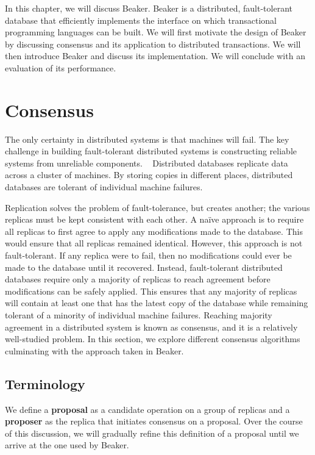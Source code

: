 \documentclass[../main.tex]{subfiles}
\begin{document}
In this chapter, we will discuss Beaker. Beaker is a distributed, fault-tolerant database that
efficiently implements the interface on which transactional programming languages can be built. We
will first motivate the design of Beaker by discussing consensus and its application to distributed
transactions. We will then introduce Beaker and discuss its implementation. We will conclude with an
evaluation of its performance.

\section{Consensus}
The only certainty in distributed systems is that machines will fail. The key challenge in building
fault-tolerant distributed systems is constructing reliable systems from unreliable components.
~\cite{reliability} Distributed databases replicate data across a cluster of machines. By storing
copies in different places, distributed databases are tolerant of individual machine failures.

Replication solves the problem of fault-tolerance, but creates another; the various replicas must be
kept consistent with each other. A na\"ive approach is to require all replicas to first agree to
apply any modifications made to the database. This would ensure that all replicas remained
identical. However, this approach is not fault-tolerant. If any replica were to fail, then no
modifications could ever be made to the database until it recovered. Instead, fault-tolerant
distributed databases require only a majority of replicas to reach agreement before modifications
can be safely applied. This ensures that any majority of replicas will contain at least one that has
the latest copy of the database while remaining tolerant of a minority of individual machine
failures. Reaching majority agreement in a distributed system is known as consensus, and it is a
relatively well-studied problem. In this section, we explore different consensus algorithms
culminating with the approach taken in Beaker.

  \subsection{Terminology}
  We define a \textbf{proposal} as a candidate operation on a group of replicas and a
  \textbf{proposer} as the replica that initiates consensus on a proposal. Over the course of this
  discussion, we will gradually refine this definition of a proposal until we arrive at the one used
  by Beaker.
\end{document}
